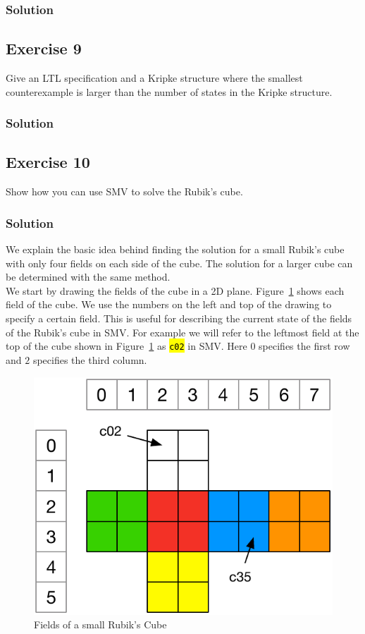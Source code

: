\documentclass[a4paper, 11pt]{article}
\newcommand{\code}[1]
{
    \hl{\texttt{#1}}
}
\begin{document}
\subsubsection{Solution}



\subsection{Exercise 9}

Give an LTL specification and a Kripke structure where the smallest counterexample is larger than the number of states in the Kripke structure.

\subsubsection{Solution}



\subsection{Exercise 10}

Show how you can use SMV to solve the Rubik’s cube.

\subsubsection{Solution}

We explain the basic idea behind finding the solution for a small Rubik's cube with only four fields on each side of the cube. The solution for a larger cube can be determined with the same method.\\

We start by drawing the fields of the cube in a 2D plane. Figure~\ref{fig:Figures_Rubik's_Cube_-_2D} shows each field of the cube. We use the numbers on the left and top of the drawing to specify a certain field. This is useful for describing the current state of the fields of the Rubik's cube in SMV. For example we will refer to the leftmost field at the top of the cube shown in Figure~\ref{fig:Figures_Rubik's_Cube_-_2D} as \code{c02} in SMV. Here $0$ specifies the first row and $2$ specifies the third column.

\begin{figure}[h]
  \centering
    \includegraphics[width=.6\textwidth]{Figures/Rubik's Cube - 2D.pdf}
  \caption{Fields of a small Rubik's Cube}
  \label{fig:Figures_Rubik's_Cube_-_2D}
\end{figure}
\end{document}

